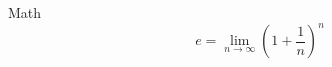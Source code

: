 \documentclass[aspectratio=169]{beamer}
\begin{document}


\begin{frame}{Math}
  \begin{equation*}
    e = \lim_{n\to \infty} \left(1 + \frac{1}{n}\right)^n
  \end{equation*}
\end{frame}

%
%
\end{document}
